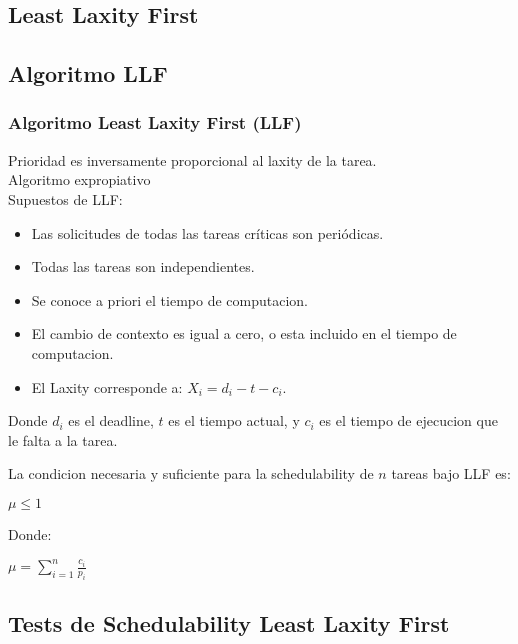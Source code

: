\documentclass[xcolor=table]{beamer}
\begin{document}
\begin{frame}
\section{Least Laxity First}

\subsection{Algoritmo LLF}

\begin{frame} 
\frametitle{Algoritmo Least Laxity First (LLF)} 

Prioridad es inversamente proporcional al laxity de la tarea. \\
Algoritmo expropiativo\\
Supuestos de LLF:
\begin{itemize}
\item Las solicitudes de todas las tareas críticas son periódicas.
\item Todas las tareas son independientes.
\item Se conoce a priori el tiempo de computacion.
\item El cambio de contexto es igual a cero, o esta incluido en el tiempo de computacion.
\item El Laxity corresponde a: $X_i = d_i - t - c_i$.
\end{itemize} 

Donde $d_i$ es el deadline, $t$ es el tiempo actual, y $c_i$ es el tiempo de ejecucion que le falta a la tarea.

La condicion necesaria y suficiente para la schedulability de $n$ tareas bajo LLF es:
\begin{center}
$\mu \leq 1$
\end{center}

Donde:
\begin{center}
$\mu = \sum_{i=1}^{n}\frac{c_i}{p_i}$
\end{center}

\end{frame}

\subsection{Tests de Schedulability  Least Laxity First } 


\end{frame}
\end{document}
